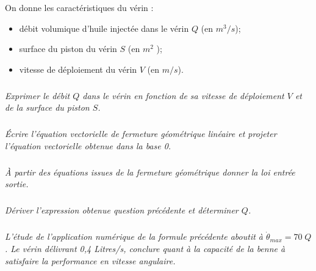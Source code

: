 \documentclass[10pt]{article}
\newif\ifprof
\begin{document}
On donne les caractéristiques du vérin : 
\begin{itemize}
\item débit volumique d'huile injectée dans le vérin $Q$ (en $m^3/s$);
\item surface du piston du vérin $S$ (en $m^2$ );
\item vitesse de déploiement du vérin $V$ (en $m/s$). 
\end{itemize}

\subparagraph{}
\textit{Exprimer le débit $Q$ dans le vérin en fonction de sa vitesse de déploiement $V$ et de la surface du piston $S$.}
\ifprof
\begin{corrige}
\end{corrige}
\else
\fi

\subparagraph{}
\textit{Écrire l'équation vectorielle de fermeture géométrique linéaire et projeter l’équation vectorielle obtenue dans la base 0. }
\ifprof
\begin{corrige}
\end{corrige}
\else
\fi

\subparagraph{}
\textit{À partir des équations issues de la fermeture géométrique donner la loi entrée sortie. }
\ifprof
\begin{corrige}
\end{corrige}
\else
\fi

\subparagraph{}
\textit{ Dériver l'expression obtenue question précédente et déterminer $Q$. }
\ifprof
\begin{corrige}
\end{corrige}
\else
\fi

\subparagraph{}
\textit{ L'étude de l'application numérique de la formule précédente aboutit à $\dot{\theta}_{max} = 70 \; Q$. Le vérin délivrant 0,4 Litres/s, conclure quant à la capacité de la benne à satisfaire la performance en vitesse angulaire. }
\ifprof
\begin{corrige}
\end{corrige}
\else
\fi
\end{document}
